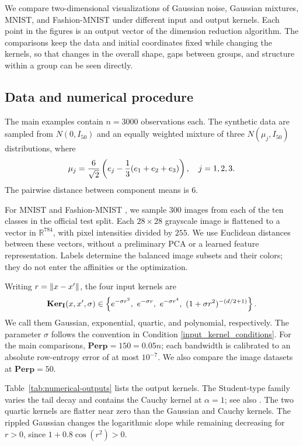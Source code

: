 We compare two-dimensional visualizations of Gaussian noise, Gaussian mixtures,
MNIST, and Fashion-MNIST under different input and output kernels. Each point
in the figures is an output vector of the dimension reduction algorithm.
The comparisons keep the data and initial coordinates fixed while changing
the kernels, so that changes in the overall shape, gaps between groups, and
structure within a group can be seen directly.

\subsection{Data and numerical procedure}

The main examples contain $n=3000$ observations each. The synthetic data are
sampled from $N(0,I_{50})$ and an equally weighted mixture of three
$N(\mu_j,I_{50})$ distributions, where
\begin{align}
    \mu_j=\frac{6}{\sqrt{2}}
    \left(e_j-\frac13(e_1+e_2+e_3)\right),\quad j=1,2,3. \notag
\end{align}
The pairwise distance between component means is $6$.

For MNIST \citep{lecun-mnist} and Fashion-MNIST \citep{xiao2017fashion}, we
sample $300$ images from each of the ten classes in the official test split.
Each $28\times28$ grayscale image is flattened to a vector in
$\mathbb{R}^{784}$, with pixel intensities divided by $255$. We use Euclidean
distances between these vectors, without a preliminary PCA or a learned
feature representation. Labels determine the balanced image subsets and
their colors; they do not enter the affinities or the optimization.

Writing $r=\left\lVert x-x'\right\rVert$, the four input kernels are
\begin{align}
    \mathbf{Ker}_{\mathbf{I}}(x,x',\sigma)\in\left\{
    e^{-\sigma r^2},\ e^{-\sigma r},\ e^{-\sigma r^4},\
    (1+\sigma r^2)^{-(d/2+1)}\right\}.
    \label{eq:numerical-inputs}
\end{align}
We call them Gaussian, exponential, quartic, and polynomial, respectively.
The parameter $\sigma$ follows the convention in Condition
\ref{input_kernel_conditions}. For the main comparisons,
$\textbf{Perp}=150=0.05n$; each bandwidth is calibrated to an absolute
row-entropy error of at most $10^{-7}$. We also compare the image datasets
at $\textbf{Perp}=50$.

Table~\ref{tab:numerical-outputs} lists the output kernels. The Student-type family
varies the tail decay and contains the Cauchy kernel at $\alpha=1$; see also
\citep{10.1007/978-3-030-46150-8_8}. The two quartic kernels are flatter near
zero than the Gaussian and Cauchy kernels. The rippled Gaussian changes the
logarithmic slope while remaining decreasing for $r>0$, since
$1+0.8\cos(r^2)>0$.

